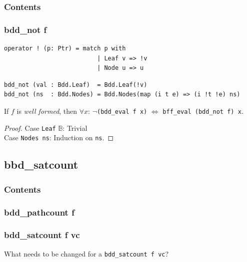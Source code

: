 \documentclass[english, aspectratio=169]{beamer}
\newcommand{\B}[0]{\ensuremath{\mathbb{B}}}
\begin{document}
\begin{frame}{}
  \frametitle{Contents}
\end{frame}

\begin{frame}[fragile]
  \frametitle{bdd\_not f}

  \begin{lstlisting}
operator ! (p: Ptr) = match p with
                          | Leaf v => !v
                          | Node u => u
  \end{lstlisting}
  \begin{lstlisting}[firstnumber=4]
bdd_not (val : Bdd.Leaf)  = Bdd.Leaf(!v)
bdd_not (ns  : Bdd.Nodes) = Bdd.Nodes(map (i t e) => (i !t !e) ns)
  \end{lstlisting}

  \pause

  \begin{theorem}
    If $f$ is \emph{well formed}, then $\forall x$: $\neg$\texttt{(bdd\_eval f x)} $\iff$
    \texttt{bff\_eval (bdd\_not f) x}.
  \end{theorem}
  \begin{proof}
    Case \texttt{Leaf} $\B$: Trivial\\
    Case \texttt{Nodes ns}: Induction on \texttt{ns}.
  \end{proof}
\end{frame}

\subsection{bbd\_satcount}

\begin{frame}{}
  \frametitle{Contents}
\end{frame}

\begin{frame}
  \frametitle{bdd\_pathcount f}

  
\end{frame}

\begin{frame}{}
  \frametitle{bdd\_satcount f vc}

  \begin{center}
    \Huge

    What needs to be changed for a \texttt{bdd\_satcount f vc}?
  \end{center}
\end{frame}
\end{document}
